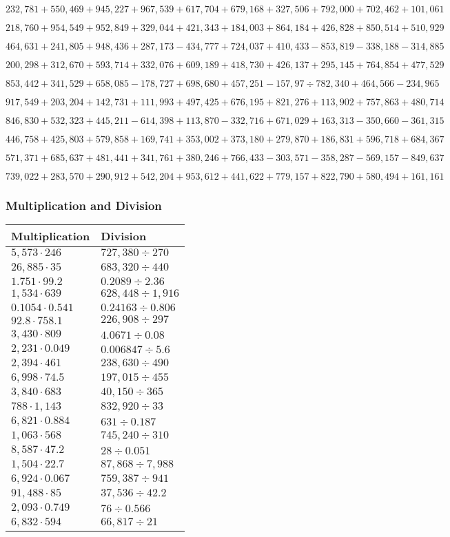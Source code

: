 \(232,781+550,469+945,227+967,539+617,704+679,168+327,506+792,000+702,462+ 101,061\)

\(218,760+954,549+952,849+329,044+421,343+184,003+864,184+426,828+850,514+510,929\)

\(464,631+241,805+948,436+287,173-434,777+724,037+410,433-853,819-338,188-314,885\)

\(200,298+312,670+593,714+332,076+609,189+418,730+426,137+295,145+764,854+477,529\)

\(853,442+341,529+658,085-178,727+698,680+457,251-157,97÷782,340+464,566-234,965\)

\(917,549+203,204+142,731+111,993+497,425+676,195+821,276+113,902+757,863+480,714\)

\(846,830+532,323+445,211-614,398+113,870-332,716+671,029+163,313-350,660-361,315\)

\(446,758+425,803+579,858+169,741+353,002+373,180+279,870+186,831+596,718+684,367\)

\(571,371+685,637+481,441+341,761+380,246+766,433-303,571-358,287-569,157-849,637\)

\(739,022+283,570+290,912+542,204+953,612+441,622+779,157+822,790+580,494+161,161\)

\hypertarget{multiplication-and-division-328}{%
\subsubsection{Multiplication and
Division}\label{multiplication-and-division-328}}

\begin{longtable}[]{@{}ll@{}}
\toprule
Multiplication & Division\tabularnewline
\midrule
\endhead
\(5,573\cdot246\) & \(727,380÷270\)\tabularnewline
\(26,885\cdot35\) & \(683,320÷440\)\tabularnewline
\(1.751\cdot99.2\) & \(0.2089÷2.36\)\tabularnewline
\(1,534\cdot639\) & \(628,448÷1,916\)\tabularnewline
\(0.1054\cdot0.541\) & \(0.24163÷0.806\)\tabularnewline
\(92.8\cdot758.1\) & \(226,908÷297\)\tabularnewline
\(3,430\cdot809\) & \(4.0671÷0.08\)\tabularnewline
\(2,231\cdot0.049\) & \(0.006847÷5.6\)\tabularnewline
\(2,394\cdot461\) & \(238,630÷490\)\tabularnewline
\(6,998\cdot74.5\) & \(197,015÷455\)\tabularnewline
\(3,840\cdot683\) & \(40,150÷365\)\tabularnewline
\(788\cdot1,143\) & \(832,920÷33\)\tabularnewline
\(6,821\cdot0.884\) & \(631÷0.187\)\tabularnewline
\(1,063\cdot568\) & \(745,240÷310\)\tabularnewline
\(8,587\cdot47.2\) & \(28÷0.051\)\tabularnewline
\(1,504\cdot22.7\) & \(87,868÷7,988\)\tabularnewline
\(6,924\cdot0.067\) & \(759,387÷941\)\tabularnewline
\(91,488\cdot85\) & \(37,536÷42.2\)\tabularnewline
\(2,093\cdot0.749\) & \(76÷0.566\)\tabularnewline
\(6,832\cdot594\) & \(66,817÷21\)\tabularnewline
\bottomrule
\end{longtable}

